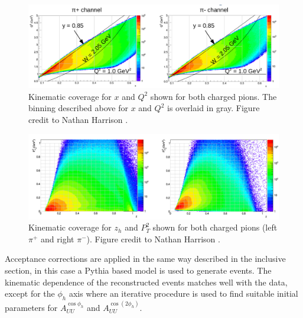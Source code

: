 \begin{figure}
  \centering 

  \includegraphics[width=14cm]{image/nathan-xq2.png}
  \caption{Kinematic coverage for $x$ and $Q^2$ shown for both charged pions.  The binning described above for $x$ and $Q^2$ is overlaid in gray.  Figure credit to Nathan Harrison \cite{theses-harrison:2015}.}

\end{figure}

\begin{figure}
  \centering 

  \includegraphics[width=14cm]{image/nathan-zpt.png}
  \caption{Kinematic coverage for $z_h$ and $P_{T}^{2}$ shown for both charged pions (left $\pi^+$ and right $\pi^-$).  Figure credit to Nathan Harrison \cite{theses-harrison:2015}.}

\end{figure}

Acceptance corrections are applied in the same way described in the inclusive section, in this case a Pythia based model is used to generate events.  The kinematic dependence of the reconstructed events matches well with the data, except for the $\phi_h$ axis where an iterative procedure is used to find suitable initial parameters for $A_{UU}^{\cos\phi_h}$ and $A_{UU}^{\cos(2\phi_h)}$.  \\

